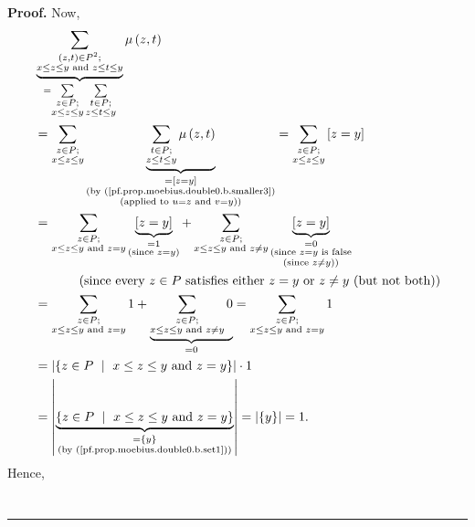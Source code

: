 \documentclass[numbers=enddot,12pt,final,onecolumn,notitlepage]{scrartcl}%
\theoremstyle{definition}
\newenvironment{proof}[1][Proof]{\noindent\textbf{#1.} }{\ \rule{0.5em}{0.5em}}
\newenvironment{verlong}{}{}
\let\sumnonlimits\sum
\renewcommand{\sum}{\sumnonlimits\limits}
\begin{document}
\begin{verlong}
\begin{proof}
Now,%
\begin{align*}
&  \underbrace{\sum_{\substack{\left(  z,t\right)  \in P^{2};\\x\leq z\leq
y\text{ and }z\leq t\leq y}}}_{=\sum_{\substack{z\in P;\\x\leq z\leq y}%
}\sum_{\substack{t\in P;\\z\leq t\leq y}}}\mu\left(  z,t\right) \\
&  =\sum_{\substack{z\in P;\\x\leq z\leq y}}\underbrace{\sum_{\substack{t\in
P;\\z\leq t\leq y}}\mu\left(  z,t\right)  }_{\substack{=\left[  z=y\right]
\\\text{(by (\ref{pf.prop.moebius.double0.b.smaller3})}\\\text{(applied to
}u=z\text{ and }v=y\text{))}}}=\sum_{\substack{z\in P;\\x\leq z\leq y}}\left[
z=y\right] \\
&  =\sum_{\substack{z\in P;\\x\leq z\leq y\text{ and }z=y}}\underbrace{\left[
z=y\right]  }_{\substack{=1\\\text{(since }z=y\text{)}}}+\sum_{\substack{z\in
P;\\x\leq z\leq y\text{ and }z\neq y}}\underbrace{\left[  z=y\right]
}_{\substack{=0\\\text{(since }z=y\text{ is false}\\\text{(since }z\neq
y\text{))}}}\\
&  \ \ \ \ \ \ \ \ \ \ \left(  \text{since every }z\in P\text{ satisfies
either }z=y\text{ or }z\neq y\text{ (but not both)}\right) \\
&  =\sum_{\substack{z\in P;\\x\leq z\leq y\text{ and }z=y}}1+\underbrace{\sum
_{\substack{z\in P;\\x\leq z\leq y\text{ and }z\neq y}}0}_{=0}=\sum
_{\substack{z\in P;\\x\leq z\leq y\text{ and }z=y}}1\\
&  =\left\vert \left\{  z\in P\ \mid\ x\leq z\leq y\text{ and }z=y\right\}
\right\vert \cdot1\\
&  =\left\vert \underbrace{\left\{  z\in P\ \mid\ x\leq z\leq y\text{ and
}z=y\right\}  }_{\substack{=\left\{  y\right\}  \\\text{(by
(\ref{pf.prop.moebius.double0.b.set1}))}}}\right\vert =\left\vert \left\{
y\right\}  \right\vert =1.
\end{align*}
Hence,%
\begin{align*}

\end{align*}
\end{proof}
\end{verlong}
\end{document}
